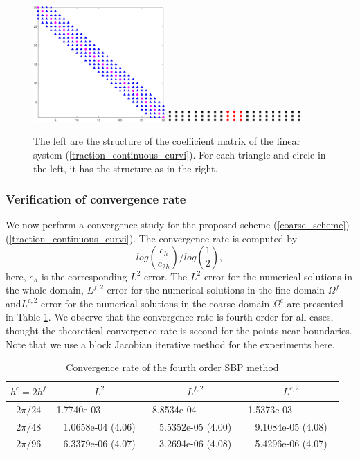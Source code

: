 \documentclass[a4paper]{article}
\begin{document}
\begin{figure}[H]
	\centering
	\includegraphics[width=0.45\textwidth]{Mass_matrix.eps}
	\includegraphics[width=0.45\textwidth]{Mass_block_diagonal.eps}
	\caption{\scriptsize{The left are the structure of the coefficient matrix of the linear system (\ref{traction_continuous_curvi}). For each triangle and circle in the left, it has the structure as in the right.}}\label{Mass_matrix}
\end{figure}

\subsubsection{Verification of convergence rate}\label{convergence_study}
We now perform a convergence study for the proposed scheme (\ref{coarse_scheme})--(\ref{traction_continuous_curvi}). The convergence rate is computed by
\[log\left(\frac{e_h}{e_{2h}}\right)\Bigg/log\left(\frac{1}{2}\right),\]
here, $e_h$ is the corresponding $L^2$ error.  The $L^2$ error for the numerical solutions in the whole domain, $L^{f,2}$ error for the numerical solutions in the fine domain $\Omega^f$ and$L^{c,2}$ error for the numerical solutions in the coarse domain $\Omega^c$ are presented in Table \ref{convergence_rate}. We observe that the convergence rate is fourth order for all cases, thought the theoretical convergence rate is second for the points near boundaries. Note that we use a block Jacobian iterative method for the experiments here.

\begin{table}[htb]
	\begin{center}
		\begin{tabular}{|c|c c c|}
			\hline
		    $h^c = 2h^f$   & $L^2$ & $L^{f,2}$ & $L^{c,2}$  \\
			\hline
			$2\pi/24$ &1.7740e-03 ~~~~~~~~ & 8.8534e-04 ~~~~~~~~ & 1.5373e-03 ~~~~~~~~\\
			\hline
			$2\pi/48$ &1.0658e-04 (4.06) & 5.5352e-05 (4.00) & 9.1084e-05 (4.08)\\
			\hline 
			$2\pi/96$ &6.3379e-06 (4.07) & 3.2694e-06 (4.08) & 5.4296e-06 (4.07)\\
			\hline
		\end{tabular}
	\end{center}
  \caption{Convergence rate of the fourth order SBP method}\label{convergence_rate}
\end{table} 
\end{document}
